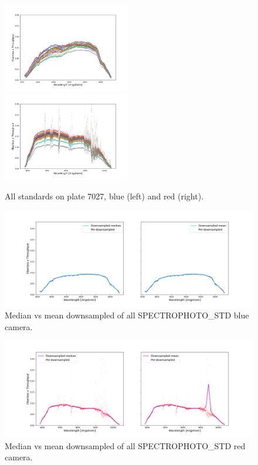 \begin{figure}[h]
    \centering
    \includegraphics[width=0.495\textwidth]{images/specsim/all_standards_blue.png}
    \includegraphics[width=0.495\textwidth]{images/specsim/all_standards_red.png}
    \caption{All standards on plate 7027, blue (left) and red (right).}
    \label{fig:all_stds}
\end{figure}

\begin{figure}[h]
    \centering
    \includegraphics[width=20cm]{images/specsim/downsampled_blue.png}
    \caption{Median vs mean downsampled of all SPECTROPHOTO\_STD blue camera.}
    \label{fig:downsampled_blue}
\end{figure}


\begin{figure}[h]
\centering
\includegraphics[width=20cm]{images/specsim/downsampled_red.png}
\caption{Median vs mean downsampled of all SPECTROPHOTO\_STD red camera.}
\label{fig:downsampled_red}
\end{figure}

